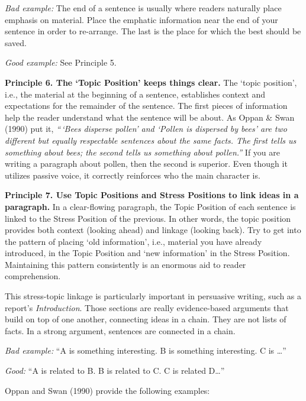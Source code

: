 \documentclass[
]{book}
\begin{document}
\emph{Bad example:} The end of a sentence is usually where readers naturally place emphasis on material. Place the emphatic information near the end of your sentence in order to re-arrange. The last is the place for which the best should be saved.

\emph{Good example:} See Principle 5.

\textbf{Principle 6. The `Topic Position' keeps things clear.} The `topic position', i.e., the material at the beginning of a sentence, establishes context and expectations for the remainder of the sentence. The first pieces of information help the reader understand what the sentence will be about. As Oppan \& Swan (1990) put it, \emph{``\,`Bees disperse pollen' and `Pollen is dispersed by bees' are two different but equally respectable sentences about the same facts. The first tells us something about bees; the second tells us something about pollen.''} If you are writing a paragraph about pollen, then the second is superior. Even though it utilizes passive voice, it correctly reinforces who the main character is.

\textbf{Principle 7. Use Topic Positions and Stress Positions to link ideas in a paragraph.} In a clear-flowing paragraph, the Topic Position of each sentence is linked to the Stress Position of the previous. In other words, the topic position provides both context (looking ahead) and linkage (looking back). Try to get into the pattern of placing `old information', i.e., material you have already introduced, in the Topic Position and `new information' in the Stress Position. Maintaining this pattern consistently is an enormous aid to reader comprehension.

This stress-topic linkage is particularly important in persuasive writing, such as a report's \emph{Introduction}. Those sections are really evidence-based arguments that build on top of one another, connecting ideas in a chain. They are not lists of facts.
In a strong argument, sentences are connected in a chain.

\emph{Bad example:} ``A is something interesting. B is something interesting. C is \ldots{}''

\emph{Good:} ``A is related to B. B is related to C. C is related D\ldots{}''

Oppan and Swan (1990) provide the following examples:
\end{document}

